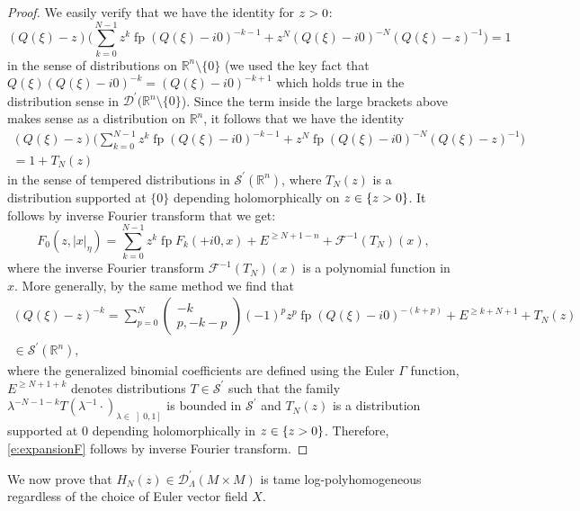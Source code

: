 \documentclass[10pt]{amsart}
\let\pazocal\mathscr
\theoremstyle{definition}
\let\euler X
\let\Im\relax
\DeclareMathOperator{\Im}{Im}
\DeclareMathOperator*{\pf}{fp}
\newcommand{\opencl}[1]{\mathopen{}\mathclose{\left]#1 \right]}}
\begin{document}
\begin{proof}
We easily verify that we have the identity for $\Im z>0$:
\[
(Q(\xi)-z) \biggl(\sum_{k=0}^{N-1} z^k\pf \left(Q(\xi)-i0\right)^{-k-1}+z^N\left(Q(\xi)-i0\right)^{-N} \left(Q(\xi)-z\right)^{-1}\biggr)=1
\]
in the sense of distributions on $\mathbb{R}^n\setminus \{0\}$ (we used the key fact that $Q(\xi)(Q(\xi)-i0)^{-k}=(Q(\xi)-i0)^{-k+1}$ which holds true in the distribution sense in $\pazocal{D}^\prime(\mathbb{R}^n\setminus\{0\}$).
{Since} the term inside the large brackets above makes sense as a distribution on $\mathbb{R}^n$,
it follows that we have the identity
\begin{multline*}
(Q(\xi)-z)\biggl(\sum_{k=0}^{N-1} z^k\pf \left(Q(\xi)-i0\right)^{-k-1}+z^N\pf\left(Q(\xi)-i0\right)^{-N} \left(Q(\xi)-z\right)^{-1}\biggr)\\
=1+T_N(z)
\end{multline*}
in the sense of tempered distributions in $\pazocal{S}^\prime(\mathbb{R}^n)$,
where $T_N(z)$ is a distribution supported at $\{0\}$ depending holomorphically on $z\in \{\Im z>0\}$.
It follows by inverse Fourier transform
that we get:
\[
F_{0}(z,\vert x\vert_\eta)=\sum_{k=0}^{N-1} z^k \pf F_{k}(+i0,x)+E^{\geqslant N+1-n}+\pazocal{F}^{-1}\left(T_N\right)(x),
\]
where the inverse Fourier transform
$\pazocal{F}^{-1}\left(T_N\right)(x)$ is a polynomial function in $x$.
More generally, by the same method we find that
\begin{multline*}
(Q(\xi)-z)^{-k}=\sum_{p=0}^N \begin{pmatrix}
-k\\
p,-k-p
\end{pmatrix} (-1)^pz^{p} {\pf (Q(\xi)-i0)^{-(k+p)}}+E^{\geqslant k+N+1 }+T_N(z)\\[-10pt]
\in \pazocal{S}^\prime(\mathbb{R}^n),
\end{multline*}
where the generalized binomial coefficients are defined using the
Euler $\Gamma$ function, $E^{\geqslant N+1+k } $ denotes distributions $T\in \pazocal{S}^\prime$
such that the family $ \lambda^{-N-1-k} T(\lambda^{-1}\cdot)_{\lambda\in \opencl{0,1}}$ is bounded in $\pazocal{S}^\prime$ and $T_N(z)$ is a distribution supported at $0$ depending holomorphically in $z\in \{\Im z>0\}$. Therefore, \eqref{e:expansionF}
follows by inverse Fourier transform.
\end{proof}

We now prove that $H_N(z)\in \pazocal{D}^\prime_\Lambda(M\times M)$ is tame log-polyhomogeneous regardless of the choice of Euler vector field $\euler$.
\end{document}
